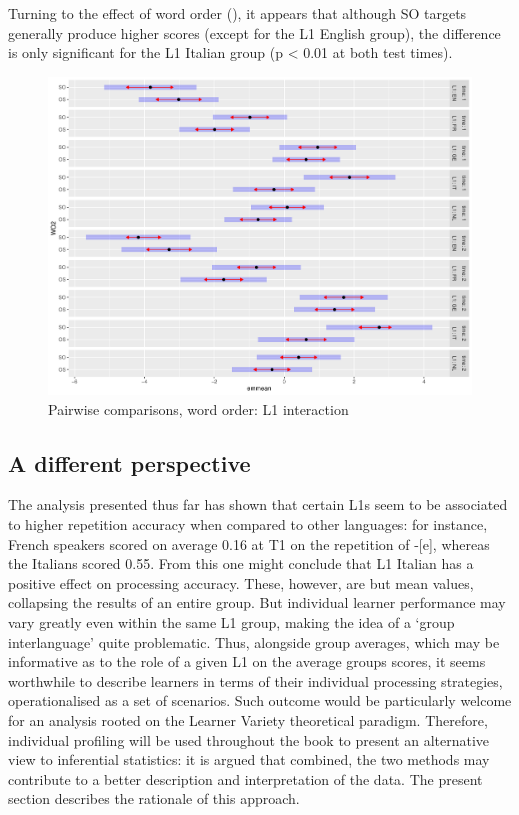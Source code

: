 Turning to the effect of word order (), it appears that although SO targets generally produce higher scores (except for the L1 English group), the difference is only significant for the L1 Italian group (p < 0.01 at both test times).

\begin{figure}
    \includegraphics[width=\textwidth]{figures/04-4.pdf}
    \caption{Pairwise comparisons, word order: L1 interaction}
    \label{fig:04:4}
\end{figure}

\subsection{A different perspective}\label{sec:04:2.4}

The analysis presented thus far has shown that certain L1s seem to be associated to higher repetition accuracy when compared to other languages: for instance, French speakers scored on average 0.16 at T1 on the repetition of -[e], whereas the Italians scored 0.55. From this one might conclude that L1 Italian has a positive effect on processing accuracy. These, however, are but mean values, collapsing the results of an entire group. But individual learner performance may vary greatly even within the same L1 group, making the idea of a ‘group interlanguage’ quite problematic. Thus, alongside group averages, which may be informative as to the role of a given L1 on the average groups scores, it seems worthwhile to describe learners in terms of their individual processing strategies, operationalised as a set of scenarios. Such outcome would be particularly welcome for an analysis rooted on the Learner Variety theoretical paradigm. Therefore, individual profiling will be used throughout the book to present an alternative view to inferential statistics: it is argued that combined, the two methods may contribute to a better description and interpretation of the data. The present section describes the rationale of this approach.

